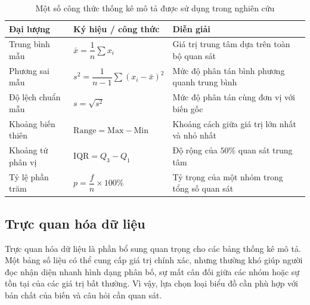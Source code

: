 \documentclass[../main.tex]{subfiles}
\begin{document}
\begin{table}[H]
    \centering
    \caption{Một số công thức thống kê mô tả được sử dụng trong nghiên cứu}
    \label{tab:t1:formulas}
    \renewcommand{\arraystretch}{1.25}
    \begin{tabular}{|>{\raggedright\arraybackslash}m{}|>{\raggedright\arraybackslash}m{}|>{\raggedright\arraybackslash}m{}|}
        \hline
        \textbf{Đại lượng} &
        \textbf{Ký hiệu / công thức} &
        \textbf{Diễn giải} \\
        \hline

        Trung bình mẫu &
        $\bar{x} = \dfrac{1}{n}\sum x_i$ &
        Giá trị trung tâm dựa trên toàn bộ quan sát \\
        \hline

        Phương sai mẫu &
        $s^2 = \dfrac{1}{n-1}\sum(x_i-\bar{x})^2$ &
        Mức độ phân tán bình phương quanh trung bình \\
        \hline

        Độ lệch chuẩn mẫu &
        $s = \sqrt{s^2}$ &
        Mức độ phân tán cùng đơn vị với biến gốc \\
        \hline

        Khoảng biến thiên &
        $\mathrm{Range} = \mathrm{Max}-\mathrm{Min}$ &
        Khoảng cách giữa giá trị lớn nhất và nhỏ nhất \\
        \hline

        Khoảng tứ phân vị &
        $\mathrm{IQR} = Q_3-Q_1$ &
        Độ rộng của $50\%$ quan sát trung tâm \\
        \hline

        Tỷ lệ phần trăm &
        $p = \dfrac{f}{n}\times100\%$ &
        Tỷ trọng của một nhóm trong tổng số quan sát \\
        \hline
    \end{tabular}
\end{table}

\subsection{Trực quan hóa dữ liệu}

Trực quan hóa dữ liệu là phần bổ sung quan trọng cho các bảng thống kê mô tả. Một bảng số liệu có thể cung cấp giá trị chính xác, nhưng thường khó giúp người đọc nhận diện nhanh hình dạng phân bố, sự mất cân đối giữa các nhóm hoặc sự tồn tại của các giá trị bất thường. Vì vậy, lựa chọn loại biểu đồ cần phù hợp với bản chất của biến và câu hỏi cần quan sát.
\end{document}
